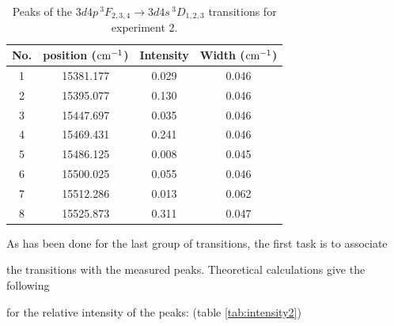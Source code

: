 \documentclass[a4paper]{article}
\begin{document}
\begin{table}[htb!]

\centering

\begin{tabular}{c|c|c|c}

\hline

No. & position ($\rm cm^{-1}$) & Intensity & Width ($\rm cm^{-1}$) \\

\hline

1 & 15381.177 & 0.029 & 0.046 \\

2 & 15395.077 & 0.130 & 0.046 \\

3 & 15447.697 & 0.035 & 0.046 \\

4 & 15469.431 & 0.241 & 0.046 \\

5 & 15486.125 & 0.008 & 0.045 \\

6 & 15500.025 & 0.055 & 0.046 \\

7 & 15512.286 & 0.013 & 0.062 \\

8 & 15525.873 & 0.311 & 0.047 \\

\hline

\end{tabular}

\caption{Peaks of the $3d4p\,^3F_{2,3,4} \to 3d4s\,^3D_{1,2,3}$ transitions for experiment 2.}

\label{tab:transitions22}

\end{table}

As has been done for the last group of transitions, the first task is to associate

the transitions with the measured peaks. Theoretical calculations give the following

for the relative intensity of the peaks: (table \ref{tab:intensity2})
\end{document}
